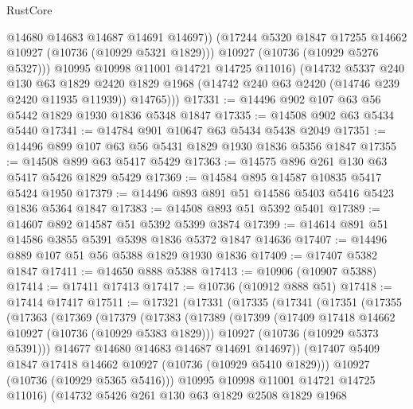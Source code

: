 \begin{lexlean}{RustCore}
\begin{coremodule}
                @14680
                @14683
                @14687
                @14691
                @14697))
            (@17244 @5320 @1847 @17255 @14662 @10927 (@10736 (@10929 @5321 @1829)))
            @10927
            (@10736 (@10929 @5276 @5327)))
          @10995
          @10998
          @11001
          @14721
          @14725
          @11016)
        (@14732
          @5337
          @240
          @130
          @63
          @1829
          @2420
          @1829
          @1968
          (@14742 @240 @63 @2420 (@14746 @239 @2420 @11935 @11939))
          @14765)))
@17331 := @14496 @902 @107 @63 @56 @5442 @1829 @1930 @1836 @5348 @1847
@17335 := @14508 @902 @63 @5434 @5440
@17341 := @14784 @901 @10647 @63 @5434 @5438 @2049
@17351 := @14496 @899 @107 @63 @56 @5431 @1829 @1930 @1836 @5356 @1847
@17355 := @14508 @899 @63 @5417 @5429
@17363 := @14575 @896 @261 @130 @63 @5417 @5426 @1829 @5429
@17369 := @14584 @895 @14587 @10835 @5417 @5424 @1950
@17379 := @14496 @893 @891 @51 @14586 @5403 @5416 @5423 @1836 @5364 @1847
@17383 := @14508 @893 @51 @5392 @5401
@17389 := @14607 @892 @14587 @51 @5392 @5399 @3874
@17399 := @14614 @891 @51 @14586 @3855 @5391 @5398 @1836 @5372 @1847 @14636
@17407 := @14496 @889 @107 @51 @56 @5388 @1829 @1930 @1836
@17409 := @17407 @5382 @1847
@17411 := @14650 @888 @5388
@17413 := @10906 (@10907 @5388)
@17414 := @17411 @17413
@17417 := @10736 (@10912 @888 @51)
@17418 := @17414 @17417
@17511 := @17321
    (@17331
      (@17335
        (@17341
          (@17351
            (@17355
              (@17363
                (@17369
                  (@17379
                    (@17383
                      (@17389
                        (@17399
                          (@17409 @17418 @14662 @10927 (@10736 (@10929 @5383 @1829)))
                          @10927
                          (@10736 (@10929 @5373 @5391)))
                        @14677
                        @14680
                        @14683
                        @14687
                        @14691
                        @14697))
                    (@17407 @5409 @1847 @17418 @14662 @10927 (@10736 (@10929 @5410 @1829)))
                    @10927
                    (@10736 (@10929 @5365 @5416)))
                  @10995
                  @10998
                  @11001
                  @14721
                  @14725
                  @11016)
                (@14732
                  @5426
                  @261
                  @130
                  @63
                  @1829
                  @2508
                  @1829
                  @1968

\end{coremodule}
\end{lexlean}
